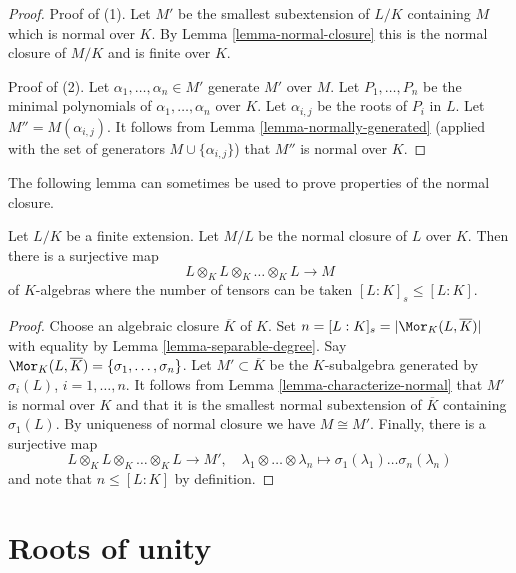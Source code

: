 \begin{proof}
Proof of (1). Let $M'$ be the smallest subextension of $L/K$ containing $M$
which is normal over $K$. By Lemma \ref{lemma-normal-closure}
this is the normal closure of $M/K$ and is finite over $K$.

\medskip\noindent
Proof of (2). Let $\alpha_1, \ldots, \alpha_n \in M'$ generate $M'$ over $M$.
Let $P_1, \ldots, P_n$ be the minimal polynomials of
$\alpha_1, \ldots, \alpha_n$ over $K$. Let $\alpha_{i, j}$ be the roots
of $P_i$ in $L$. Let $M''  = M(\alpha_{i, j})$. It follows from
Lemma \ref{lemma-normally-generated}
(applied with the set of generators $M \cup \{\alpha_{i, j}\}$)
that $M''$ is normal over $K$.
\end{proof}

\noindent
The following lemma can sometimes be used to prove properties
of the normal closure.

\begin{lemma}
\label{lemma-normal-closure-tensor-product}
Let $L/K$ be a finite extension. Let $M/L$ be the normal
closure of $L$ over $K$. Then there is a surjective map
$$
L \otimes_K L \otimes_K \ldots \otimes_K L \longrightarrow M
$$
of $K$-algebras where the number of tensors can be taken
$[L : K]_s \leq [L : K]$.
\end{lemma}

\begin{proof}
Choose an algebraic closure $\overline{K}$ of $K$.
Set $n = [L : K]_s = |\Mor_K(L, \overline{K})|$ with equality by
Lemma \ref{lemma-separable-degree}.
Say $\Mor_K(L, \overline{K}) = \{\sigma_1, \ldots, \sigma_n\}$.
Let $M' \subset \overline{K}$ be the $K$-subalgebra
generated by $\sigma_i(L)$, $i = 1, \ldots, n$.
It follows from Lemma \ref{lemma-characterize-normal}
that $M'$ is normal over $K$ and that it is the
smallest normal subextension of $\overline{K}$ containing
$\sigma_1(L)$. By uniqueness of normal closure we
have $M \cong M'$. Finally, there is a surjective map
$$
L \otimes_K L \otimes_K \ldots \otimes_K L \longrightarrow M',
\quad
\lambda_1 \otimes \ldots \otimes \lambda_n \longmapsto
\sigma_1(\lambda_1) \ldots \sigma_n(\lambda_n)
$$
and note that $n \leq [L : K]$ by definition.
\end{proof}












\section{Roots of unity}
\label{section-roots-of-1}

